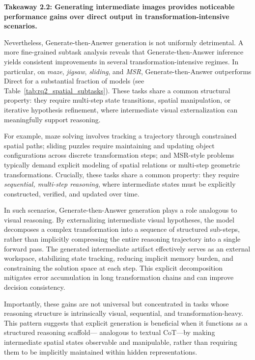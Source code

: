 \documentclass{article}
\theoremstyle{plain}
\theoremstyle{definition}
\theoremstyle{remark}
\begin{document}
\textbf{Takeaway 2.2: Generating intermediate images provides noticeable performance gains over direct output in transformation-intensive scenarios.}


Nevertheless, Generate-then-Answer generation is not uniformly detrimental. 
A more fine-grained subtask analysis reveals that Generate-then-Answer inference yields 
consistent improvements in several transformation-intensive regimes. 
In particular, on \textit{maze}, \textit{jigsaw}, \textit{sliding}, and \textit{MSR}, 
Generate-then-Answer outperforms Direct for a substantial fraction of models 
(see Table~\ref{tab:rq2_spatial_subtasks}). 
These tasks share a common structural property: 
they require multi-step state transitions, spatial manipulation, 
or iterative hypothesis refinement, where intermediate visual 
externalization can meaningfully support reasoning.

For example, maze solving involves tracking a trajectory through constrained spatial paths; 
sliding puzzles require maintaining and updating object configurations across discrete transformation steps; 
and MSR-style problems typically demand explicit modeling of spatial relations or multi-step geometric transformations. 
Crucially, these tasks share a common property: they require \emph{sequential, multi-step reasoning}, 
where intermediate states must be explicitly constructed, verified, and updated over time.

In such scenarios, Generate-then-Answer generation plays a role analogous to visual reasoning. 
By externalizing intermediate visual hypotheses, the model decomposes a complex transformation into a sequence of structured sub-steps, 
rather than implicitly compressing the entire reasoning trajectory into a single forward pass. 
The generated intermediate artifact effectively serves as an external workspace, 
stabilizing state tracking, reducing implicit memory burden, and constraining the solution space at each step. 
This explicit decomposition mitigates error accumulation in long transformation chains and can improve decision consistency.

Importantly, these gains are not universal but concentrated in tasks whose reasoning structure is intrinsically visual, 
sequential, and transformation-heavy. 
This pattern suggests that explicit generation is beneficial when it functions as a structured reasoning scaffold— 
analogous to textual CoT—by making intermediate spatial states observable and manipulable, 
rather than requiring them to be implicitly maintained within hidden representations.
\end{document}
